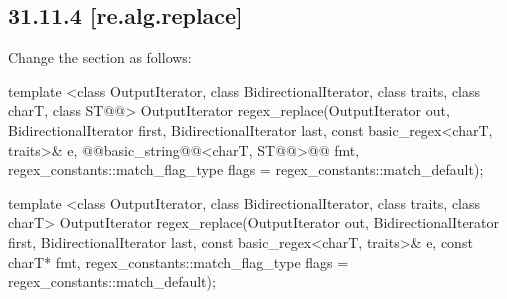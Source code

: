 \documentclass[ebook,11pt,article]{memoir}
\begin{document}
\subsection{31.11.4 [re.alg.replace]}
Change the section as follows:

\begin{itemdecl}
template <class OutputIterator, class BidirectionalIterator,
    class traits, class charT, class ST@@>
  OutputIterator 
  regex_replace(OutputIterator out,
                BidirectionalIterator first, BidirectionalIterator last,
                const basic_regex<charT, traits>& e,
                @@basic_string@@<charT, ST@@>@\removed{\&}@ fmt,
                regex_constants::match_flag_type flags =
                  regex_constants::match_default);
\end{itemdecl}
\begin{removedblock}
\begin{itemdecl}
template <class OutputIterator, class BidirectionalIterator,
    class traits, class charT>
  OutputIterator
  regex_replace(OutputIterator out,
                BidirectionalIterator first, BidirectionalIterator last,
                const basic_regex<charT, traits>& e,
                const charT* fmt,
                regex_constants::match_flag_type flags =
                  regex_constants::match_default);
\end{itemdecl}
\end{removedblock}
\end{document}
